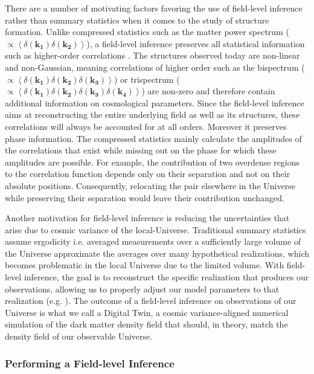There are a number of motivating factors favoring the use of field-level inference rather than summary statistics when it comes to the study of structure formation. 
Unlike compressed statistics such as the matter power spectrum ($ \propto \left \langle \delta(\mathbf{k_1})  \delta(\mathbf{k_2})\right \rangle$), a field-level inference preserves all statistical 
information such as higher-order correlations \cite{Leclercq_2021}. The structures 
observed today are non-linear and non-Gaussian, meaning correlations of higher order such as the bispectrum ($ \propto \left \langle \delta(\mathbf{k_1})  \delta(\mathbf{k_2}) \delta(\mathbf{k_3})\right \rangle$) 
or trispectrum ($ \propto \left \langle \delta(\mathbf{k_1})  \delta(\mathbf{k_2}) \delta(\mathbf{k_3}) \delta(\mathbf{k_4})\right \rangle$) are non-zero and therefore contain additional 
information on cosmological parameters. Since the field-level inference aims at reconstructing the entire underlying field as well as its structures, these correlations will always 
be accounted for at all orders. Moreover it preserves phase information. The compressed statistics mainly calculate the amplitudes of the correlations that exist while missing out 
on the phase for which these amplitudes are possible. 
For example, the contribution of two overdense regions to the correlation function depends only on their separation and not on their absolute positions. 
Consequently, relocating the pair elsewhere in the Universe while preserving their separation would leave their contribution unchanged.

\noindent Another motivation for field-level inference is reducing the uncertainties that arise due to cosmic variance of the local-Universe. Traditional summary statistics assume ergodicity 
i.e. averaged measurements over a sufficiently large volume of the Universe approximate the averages over many hypothetical realizations, which becomes problematic in 
the local Universe due to the limited volume. With field-level inference, the goal is to reconstruct the specific realization that produces our observations, allowing us to 
properly adjust our model parameters to that realization (e.g. \cite{Porqueres_2021, Ramanah_2019}). 
The outcome of a field-level inference on observations of our Universe is what we call a Digital Twin, a cosmic variance-aligned numerical simulation of the dark matter 
density field that should, in theory, match the density field of our observable Universe. \\


\subsubsection{Performing a Field-level Inference}

